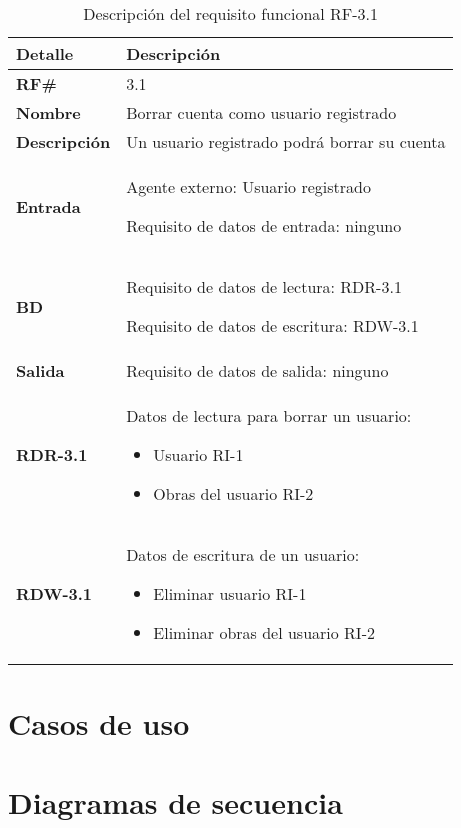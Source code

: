 \begin{table}[H]
    \centering
    \begin{tabular}{|p{4cm}|p{7cm}|}
        \hline
        \rowcolor{lightgray}
        \textbf{Detalle} & \textbf{Descripción} \\
        \hline
        \textbf{RF\#} & 3.1 \\
        \hline
        \textbf{Nombre} & Borrar cuenta como usuario registrado \\
        \hline
        \textbf{Descripción} & Un usuario registrado podrá borrar su cuenta \\
        \hline
        \textbf{Entrada} &
        Agente externo: Usuario registrado
        
        Requisito de datos de entrada: ninguno \\
        \hline
        \textbf{BD} &
        Requisito de datos de lectura: RDR-3.1
        
        Requisito de datos de escritura: RDW-3.1 \\
        \hline
        \textbf{Salida} & Requisito de datos de salida: ninguno \\
        \hline
        \textbf{RDR-3.1} & Datos de lectura para borrar un usuario:
            \begin{itemize}
                \item Usuario RI-1
                \item Obras del usuario RI-2
            \end{itemize} \\
        \hline
        \textbf{RDW-3.1} & Datos de escritura de un usuario:
            \begin{itemize}
                \item Eliminar usuario RI-1
                \item Eliminar obras del usuario RI-2
            \end{itemize} \\
        \hline
    \end{tabular}
    \caption{Descripción del requisito funcional RF-3.1}
    \label{tab:rf-3-1}
\end{table}

\section{Casos de uso}

\section{Diagramas de secuencia}

